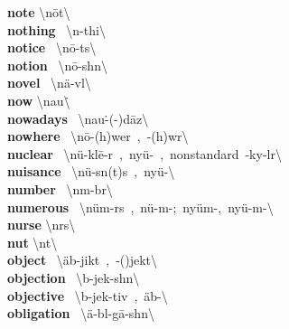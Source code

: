 \documentclass[10pt,a4paper]{article}
\begin{document}
\begin{multicols}{2}
\textbf{ note }\quad \textbackslash \textprimstress n\={o}t\textbackslash \\
\textbf{ nothing }\quad \ \textbackslash \textprimstress n\textschwa -thi\engma \textbackslash \\
\textbf{ notice }\quad \ \textbackslash \textprimstress n\={o}-t\textschwa s\textbackslash \\
\textbf{ notion }\quad \ \textbackslash \textprimstress n\={o}-sh\textschwa n\textbackslash \\
\textbf{ novel }\quad \ \textbackslash \textprimstress n\"{a}-v\textschwa l\textbackslash \\
\textbf{ now }\quad \textbackslash \textprimstress nau\. \textbackslash \\
\textbf{ nowadays }\quad \ \textbackslash \textprimstress nau\. -(\textschwa -)\textsecstress d\={a}z\textbackslash \\
\textbf{ nowhere }\quad \ \textbackslash \textprimstress n\={o}-\textsecstress (h)wer\ ,\ -(h)w\textschwa r\textbackslash \\
\textbf{ nuclear }\quad \ \textbackslash \textprimstress n\"{u}-kl\={e}-\textschwa r\ ,\ \textprimstress ny\"{u}-\ ,\ nonstandard\ -ky\textschwa -l\textschwa r\textbackslash \\
\textbf{ nuisance }\quad \ \textbackslash \textprimstress n\"{u}-s\textsuperscript{\textreve}n(t)s\ ,\ \textprimstress ny\"{u}-\textbackslash \\
\textbf{ number }\quad \ \textbackslash \textprimstress n\textschwa m-b\textschwa r\textbackslash \\
\textbf{ numerous }\quad \ \textbackslash \textprimstress n\"{u}m-r\textschwa s\ ,\ \textprimstress n\"{u}-m\textschwa -;\ \textprimstress ny\"{u}m-,\ \textprimstress ny\"{u}-m\textschwa -\textbackslash \\
\textbf{ nurse }\quad \textbackslash \textprimstress n\textschwa rs\textbackslash \\
\textbf{ nut }\quad \textbackslash \textprimstress n\textschwa t\textbackslash \\
\textbf{ object }\quad \ \textbackslash \textprimstress \"{a}b-jikt\ ,\ -(\textsecstress )jekt\textbackslash \\
\textbf{ objection }\quad \ \textbackslash \textschwa b-\textprimstress jek-sh\textschwa n\textbackslash \\
\textbf{ objective }\quad \ \textbackslash \textschwa b-\textprimstress jek-tiv\ ,\ \"{a}b-\textbackslash \\
\textbf{ obligation }\quad \ \textbackslash \textsecstress \"{a}-bl\textschwa -\textprimstress g\={a}-sh\textschwa n\textbackslash \\

\end{multicols}
\end{document}
